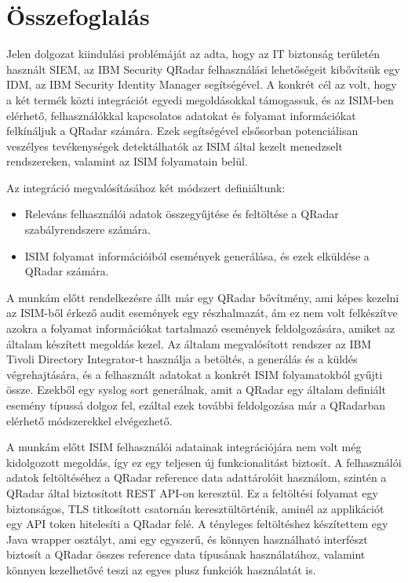 \chapter{Összefoglalás}
\label{ch:sum}

Jelen dolgozat kiindulási problémáját az adta, hogy az IT biztonság területén használt SIEM, az IBM Security QRadar felhasználási lehetőségeit kibővítsük egy IDM, az IBM Security Identity Manager segítségével. A konkrét cél az volt, hogy a két termék közti integrációt egyedi megoldásokkal támogassuk, és az ISIM-ben elérhető, felhasználókkal kapcsolatos adatokat és folyamat információkat felkínáljuk a QRadar számára. Ezek segítségével elsősorban potenciálisan veszélyes tevékenységek detektálhatók az ISIM által kezelt menedzselt rendszereken, valamint az ISIM folyamatain belül.

Az integráció megvalósításához két módszert definiáltunk:
\begin{itemize}
	\item Releváns felhasználói adatok összegyűjtése és feltöltése a QRadar szabályrendszere számára.
	\item ISIM folyamat információiból események generálása, és ezek elküldése a QRadar számára.
\end{itemize}

A munkám előtt rendelkezésre állt már egy QRadar bővítmény, ami képes kezelni az ISIM-ből érkező audit események egy részhalmazát, ám ez nem volt felkészítve azokra a folyamat információkat tartalmazó események feldolgozására, amiket az általam készített megoldás kezel. Az általam megvalósított rendszer az IBM Tivoli Directory Integrator-t használja a betöltés, a generálás és a küldés végrehajtására, és a felhasznált adatokat a konkrét ISIM folyamatokból gyűjti össze. Ezekből egy syslog sort generálnak, amit a QRadar egy általam definiált esemény típussá dolgoz fel, ezáltal ezek további feldolgozása már a QRadarban elérhető módszerekkel elvégezhető.

A munkám előtt ISIM felhasználói adatainak integrációjára nem volt még kidolgozott megoldás, így ez egy teljesen új funkcionalitást biztosít. A felhasználói adatok feltöltéséhez a QRadar reference data adattárolóit használom, szintén a QRadar által biztosított REST API-on keresztül. Ez a feltöltési folyamat egy biztonságos, TLS titkosított csatornán keresztültörténik, aminél az applikációt egy API token hitelesíti a QRadar felé. A tényleges feltöltéshez készítettem egy Java wrapper osztályt, ami egy egyszerű, és könnyen használható interfészt biztosít a QRadar összes reference data típusának használatához, valamint könnyen kezelhetővé teszi az egyes plusz funkciók használatát is.

